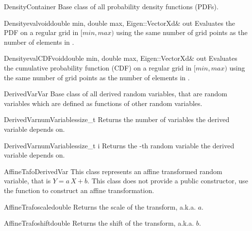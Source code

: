 \documentclass[a4paper, 10pt]{paper}
\begin{document}
\begin{defclassex}{Density}{Container}
Base class of all probability density functions (PDFs).

\begin{defmeth}{Density}{eval}{void}{double min, double max, Eigen::VectorXd\& out}
Evaluates the PDF on a regular grid in $[min, max)$ using the same number of grid points as the number
of elements in .
\end{defmeth}
 
\begin{defmeth}{Density}{evalCDF}{void}{double min, double max, Eigen::VectorXd\& out}
Evaluates the cumulative probability function (CDF) on a regular grid in $[min, max)$ using the same number
of grid points as the number of elements in .
\end{defmeth}
\end{defclassex}

\begin{defclassex}{DerivedVar}{Var}
Base class of all derived random variables, that are random variables which are defined as functions of other random 
variables.

\begin{defmeth}{DerivedVar}{numVariables}{size\_t}{}
Returns the number of variables the derived variable depends on.
\end{defmeth}

\begin{defmeth}{DerivedVar}{numVariables}{}{size\_t i}
Returns the -th random variable the derived variable depends on.
\end{defmeth}
\end{defclassex}

\begin{defclassex}{AffineTafo}{DerivedVar}
This class represents an affine transformed random variable, that is $Y = a\,X+b$. This class does not provide a
public constructor, use the  function to construct an affine transformation.

\begin{defmeth}{AffineTrafo}{scale}{double}{}
 Returns the scale of the transform, a.k.a. $a$.
\end{defmeth}

\begin{defmeth}{AffineTrafo}{shift}{double}{}
 Returns the shift of the transform, a.k.a. $b$.
\end{defmeth}
\end{defclassex}
\end{document}
